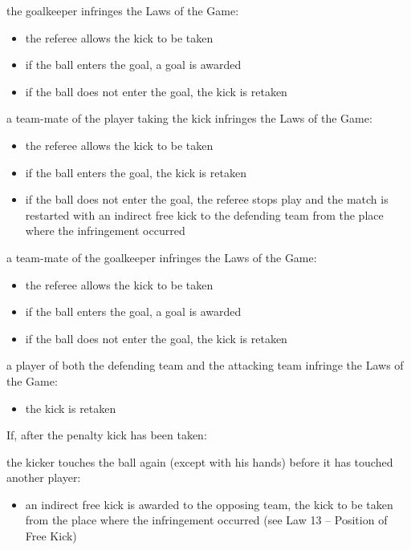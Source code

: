 the goalkeeper infringes the Laws of the Game:

\begin{itemize}
\item the referee allows the kick to be taken 
\item if the ball enters the goal, a goal is awarded 
\item if the ball does not enter the goal, the kick is retaken 
\end{itemize}

\bigskip

a team-mate of the player taking the kick infringes the Laws of the
Game: 

\begin{itemize}
\item the referee allows the kick to be taken 
\item if the ball enters the goal, the kick is retaken 
\item if the ball does not enter the goal, the referee stops play and the
match is restarted with an indirect free kick to the defending team
from the place where the infringement occurred 
\end{itemize}

\bigskip

a team-mate of the goalkeeper infringes the Laws of the Game: 

\begin{itemize}
\item the referee allows the kick to be taken 
\item if the ball enters the goal, a goal is awarded 
\item if the ball does not enter the goal, the kick is retaken 
\end{itemize}

\bigskip

a player of both the defending team and the attacking team infringe the
Laws of the Game:

\begin{itemize}
\item the kick is retaken
\end{itemize}

\bigskip

If, after the penalty kick has been taken:

the kicker touches the ball again (except with his hands) before it has
touched another player:

\begin{itemize}
\item an indirect free kick is awarded to the opposing team, the kick to be
taken from the place where the infringement occurred (see Law 13 --
Position of Free Kick)
\end{itemize}

